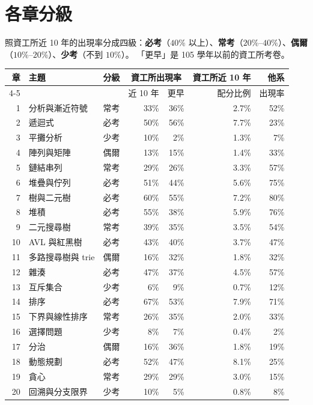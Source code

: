 \section*{各章分級}

照資工所近 10 年的出現率分成四級：\textbf{必考}（$40\%$ 以上）、\textbf{常考}（$20\%$--$40\%$）、\textbf{偶爾}（$10\%$--$20\%$）、\textbf{少考}（不到 $10\%$）。 「更早」是 105 學年以前的資工所考卷。

{\small
\begin{longtable}{rlcrrrr}
\toprule
章 & 主題 & 分級 & \multicolumn{2}{c}{資工所出現率} & 資工所近 10 年 & 他系 \\
\cmidrule(lr){4-5}
 & & & 近 10 年 & 更早 & 配分比例 & 出現率 \\
\midrule
\endhead
1 & 分析與漸近符號 & 常考 & 33\% & 36\% & 2.7\% & 52\% \\
2 & 遞迴式 & 必考 & 50\% & 56\% & 7.7\% & 23\% \\
3 & 平攤分析 & 少考 & 10\% & 2\% & 1.3\% & 7\% \\
4 & 陣列與矩陣 & 偶爾 & 13\% & 15\% & 1.4\% & 33\% \\
5 & 鏈結串列 & 常考 & 29\% & 26\% & 3.3\% & 57\% \\
6 & 堆疊與佇列 & 必考 & 51\% & 44\% & 5.6\% & 75\% \\
7 & 樹與二元樹 & 必考 & 60\% & 55\% & 7.2\% & 80\% \\
8 & 堆積 & 必考 & 55\% & 38\% & 5.9\% & 76\% \\
9 & 二元搜尋樹 & 常考 & 39\% & 35\% & 3.5\% & 54\% \\
10 & AVL 與紅黑樹 & 必考 & 43\% & 40\% & 3.7\% & 47\% \\
11 & 多路搜尋樹與 trie & 偶爾 & 16\% & 32\% & 1.8\% & 32\% \\
12 & 雜湊 & 必考 & 47\% & 37\% & 4.5\% & 57\% \\
13 & 互斥集合 & 少考 & 6\% & 9\% & 0.7\% & 12\% \\
14 & 排序 & 必考 & 67\% & 53\% & 7.9\% & 71\% \\
15 & 下界與線性排序 & 常考 & 26\% & 35\% & 2.0\% & 33\% \\
16 & 選擇問題 & 少考 & 8\% & 7\% & 0.4\% & 2\% \\
17 & 分治 & 偶爾 & 16\% & 36\% & 1.8\% & 19\% \\
18 & 動態規劃 & 必考 & 52\% & 47\% & 8.1\% & 25\% \\
19 & 貪心 & 常考 & 29\% & 29\% & 3.0\% & 15\% \\
20 & 回溯與分支限界 & 少考 & 10\% & 5\% & 0.8\% & 8\% \\

\end{longtable}}
